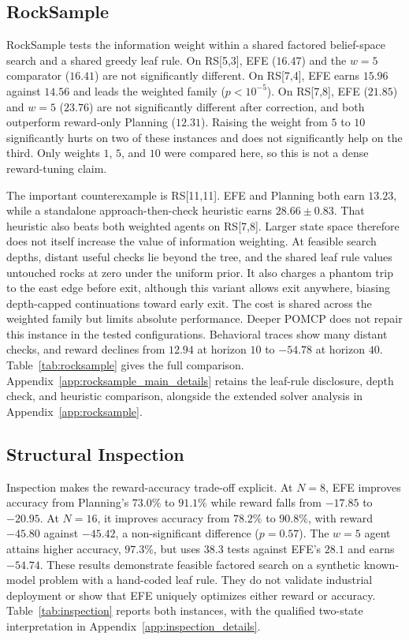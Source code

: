 \subsection{RockSample}
\label{sec:rocksample}

RockSample tests the information weight within a shared factored belief-space search and a shared greedy leaf rule. On RS[5,3], EFE ($16.47$) and the $w{=}5$ comparator ($16.41$) are not significantly different. On RS[7,4], EFE earns $15.96$ against $14.56$ and leads the weighted family ($p<10^{-5}$). On RS[7,8], EFE ($21.85$) and $w{=}5$ ($23.76$) are not significantly different after correction, and both outperform reward-only Planning ($12.31$). Raising the weight from $5$ to $10$ significantly hurts on two of these instances and does not significantly help on the third. Only weights $1$, $5$, and $10$ were compared here, so this is not a dense reward-tuning claim.



The important counterexample is RS[11,11]. EFE and Planning both earn $13.23$, while a standalone approach-then-check heuristic earns $28.66\pm0.83$. That heuristic also beats both weighted agents on RS[7,8]. Larger state space therefore does not itself increase the value of information weighting. At feasible search depths, distant useful checks lie beyond the tree, and the shared leaf rule values untouched rocks at zero under the uniform prior. It also charges a phantom trip to the east edge before exit, although this variant allows exit anywhere, biasing depth-capped continuations toward early exit. The cost is shared across the weighted family but limits absolute performance. Deeper POMCP does not repair this instance in the tested configurations. Behavioral traces show many distant checks, and reward declines from $12.94$ at horizon $10$ to $-54.78$ at horizon $40$. Table~\ref{tab:rocksample} gives the full comparison. Appendix~\ref{app:rocksample_main_details} retains the leaf-rule disclosure, depth check, and heuristic comparison, alongside the extended solver analysis in Appendix~\ref{app:rocksample}.

\subsection{Structural Inspection}
\label{sec:inspection}

Inspection makes the reward-accuracy trade-off explicit. At $N{=}8$, EFE improves accuracy from Planning's $73.0\%$ to $91.1\%$ while reward falls from $-17.85$ to $-20.95$. At $N{=}16$, it improves accuracy from $78.2\%$ to $90.8\%$, with reward $-45.80$ against $-45.42$, a non-significant difference ($p=0.57$). The $w{=}5$ agent attains higher accuracy, $97.3\%$, but uses $38.3$ tests against EFE's $28.1$ and earns $-54.74$. These results demonstrate feasible factored search on a synthetic known-model problem with a hand-coded leaf rule. They do not validate industrial deployment or show that EFE uniquely optimizes either reward or accuracy. Table~\ref{tab:inspection} reports both instances, with the qualified two-state interpretation in Appendix~\ref{app:inspection_details}.

